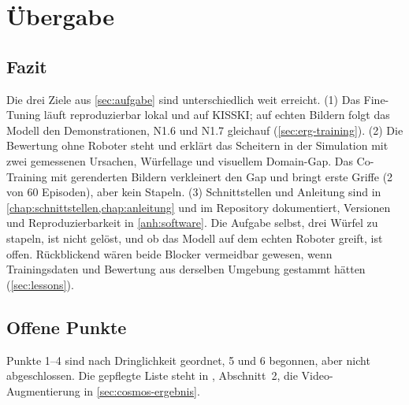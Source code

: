 
\chapter{Übergabe}
\label{chap:uebergabe}
\label{chap:fazit}
\label{chap:weiterfuehrend}
\label{sec:ausblick}
\label{sec:konsequenz}

\section{Fazit}
\label{sec:fazit}

Die drei Ziele aus \cref{sec:aufgabe} sind unterschiedlich weit erreicht.
(1) Das Fine-Tuning läuft reproduzierbar lokal und auf KISSKI; auf echten Bildern folgt das
Modell den Demonstrationen, N1.6 und N1.7 gleichauf (\cref{sec:erg-training}).
(2) Die Bewertung ohne Roboter steht und erklärt das Scheitern in der Simulation mit zwei
gemessenen Ursachen, Würfellage und visuellem Domain-Gap. Das Co-Training mit gerenderten
Bildern verkleinert den Gap und bringt erste Griffe (2 von 60 Episoden), aber kein Stapeln.
(3) Schnittstellen und Anleitung sind in \cref{chap:schnittstellen,chap:anleitung} und im
Repository dokumentiert, Versionen und Reproduzierbarkeit in \cref{anh:software}.
Die Aufgabe selbst, drei Würfel zu stapeln, ist nicht gelöst, und ob das Modell auf dem echten
Roboter greift, ist offen. Rückblickend wären beide Blocker vermeidbar gewesen, wenn
Trainingsdaten und Bewertung aus derselben Umgebung gestammt hätten (\cref{sec:lessons}).

\section{Offene Punkte}
\label{sec:offene-punkte}
\label{sec:nicht-weiter}
\label{sec:locomotion}
\label{sec:rl-weiterfuehrend}
\label{sec:synth-datensatz}
\label{sec:fortbewegung}

Punkte 1--4 sind nach Dringlichkeit geordnet, 5 und 6 begonnen, aber nicht abgeschlossen. Die
gepflegte Liste steht in , Abschnitt~2, die Video-Augmentierung in
\cref{sec:cosmos-ergebnis}.

